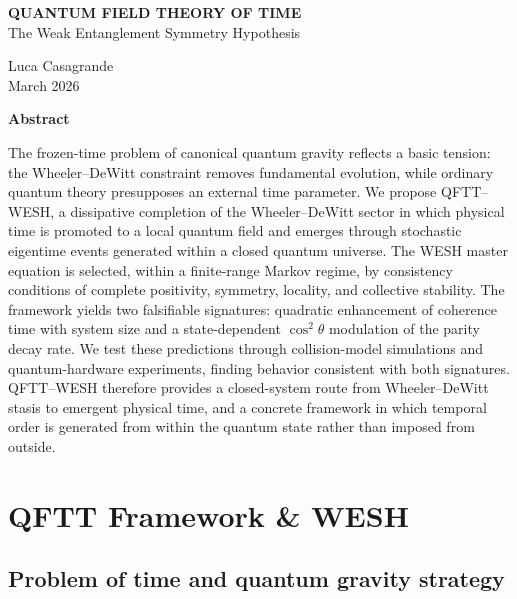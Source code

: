 \documentclass[12pt,a4paper]{article}
\numberwithin{equation}{section}
\renewenvironment{abstract}{
  \vspace*{-3cm}  
  \begin{center}
  \Large\textbf{Abstract} 
  \end{center}
  \vspace{0.5cm} 
  \noindent\ignorespaces  
}{\par\vspace{1cm}}
\begin{document}
\begin{titlepage}
{\centering 
\vspace*{2cm}
{\LARGE\bfseries
QUANTUM FIELD THEORY OF TIME\\[0.5cm]
}
\vspace{1cm}
{\Large
The Weak Entanglement Symmetry Hypothesis\\[1cm]
}
\vspace{1cm}

{\large
Luca Casagrande\\[0.5cm]
}
\vfill
{\normalsize
March 2026\\[0.5cm]
}
}
\end{titlepage}

\vspace{0.3cm}
\begin{abstract}
The frozen-time problem of canonical quantum gravity reflects a basic tension:
the Wheeler--DeWitt constraint removes fundamental evolution, while ordinary
quantum theory presupposes an external time parameter. We propose
QFTT--WESH, a dissipative completion of the Wheeler--DeWitt sector in which
physical time is promoted to a local quantum field and emerges through
stochastic eigentime events generated within a closed quantum universe.
The WESH master equation is selected, within a finite-range Markov regime,
by consistency conditions of complete positivity, symmetry, locality, and
collective stability. The framework yields two falsifiable signatures:
quadratic enhancement of coherence time with system size and a
state-dependent $\cos^2\theta$ modulation of the parity decay rate. We test
these predictions through collision-model simulations and quantum-hardware
experiments, finding behavior consistent with both signatures. QFTT--WESH
therefore provides a closed-system route from Wheeler--DeWitt stasis to
emergent physical time, and a concrete framework in which temporal order is
generated from within the quantum state rather than imposed from outside.
\end{abstract}

\clearpage

\section{QFTT Framework \& WESH}
\label{sec:qftt-framework}

\subsection{Problem of time and quantum gravity strategy}
\vspace{0.3cm}
\end{document}
